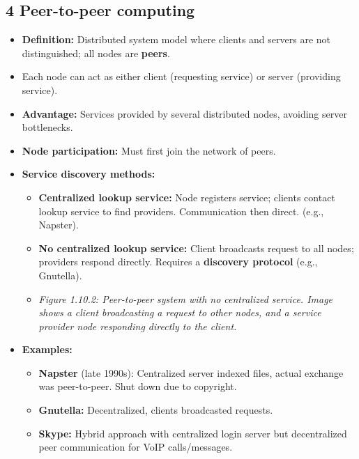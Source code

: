 \documentclass{article}
\begin{document}
\subsection*{4 Peer-to-peer computing}
\begin{itemize}
    \item \textbf{Definition:} Distributed system model where clients and servers are not distinguished; all nodes are \textbf{peers}.
    \item Each node can act as either client (requesting service) or server (providing service).
    \item \textbf{Advantage:} Services provided by several distributed nodes, avoiding server bottlenecks.
    \item \textbf{Node participation:} Must first join the network of peers.
    \item \textbf{Service discovery methods:}
    \begin{itemize}
        \item \textbf{Centralized lookup service:} Node registers service; clients contact lookup service to find providers. Communication then direct. (e.g., Napster).
        \item \textbf{No centralized lookup service:} Client broadcasts request to all nodes; providers respond directly. Requires a \textbf{discovery protocol} (e.g., Gnutella).
        \item \textit{Figure 1.10.2: Peer-to-peer system with no centralized service. Image shows a client broadcasting a request to other nodes, and a service provider node responding directly to the client.}
    \end{itemize}
    \item \textbf{Examples:}
    \begin{itemize}
        \item \textbf{Napster} (late 1990s): Centralized server indexed files, actual exchange was peer-to-peer. Shut down due to copyright.
        \item \textbf{Gnutella:} Decentralized, clients broadcasted requests.
        \item \textbf{Skype:} Hybrid approach with centralized login server but decentralized peer communication for VoIP calls/messages.
    \end{itemize}
\end{itemize}
\end{document}
